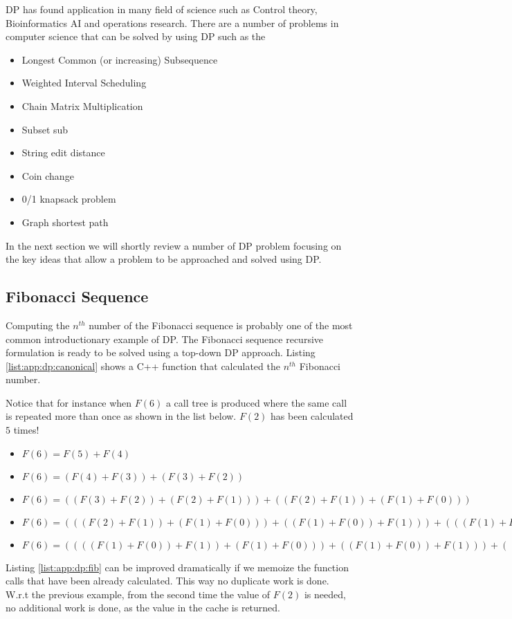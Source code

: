 DP has found application in many field of science such as Control theory,
Bioinformatics AI and operations research. There are a number of problems in
computer science that can be solved by using DP such as the 
\begin{itemize}
    \item Longest Common (or increasing) Subsequence
    \item Weighted Interval Scheduling
    \item Chain Matrix Multiplication
    \item Subset sub
    \item String edit distance
    \item Coin change
    \item 0/1 knapsack problem
    \item Graph shortest path
\end{itemize}

In the next section we will shortly review a number of DP problem focusing on
the key ideas that allow a problem to be approached and solved  using DP.

\subsection{Fibonacci Sequence}
Computing the $n^{th}$ number of the Fibonacci sequence is probably one of the
most common introductionary example of DP. The Fibonacci sequence recursive
formulation is ready to be solved using a top-down DP approach. Listing
\ref{list:app:dp:canonical} shows a C++ function that calculated the $n^{th}$ Fibonacci
number.

Notice that for instance when $F(6)$ a call tree is produced where the same call
is repeated more than once as shown in the list below. $F(2)$ has been
calculated $5$ times!
\begin{itemize}
    \item $F(6) = F(5)+F(4)$
    \item $F(6) = (F(4)+F(3)) + (F(3)+F(2))$
    \item $F(6) = ((F(3)+F(2))+(F(2)+F(1))) + ((F(2)+F(1))+(F(1)+F(0)))$
    \item $F(6) = (((F(2)+F(1))+(F(1)+F(0)))+((F(1)+F(0))+F(1))) + (((F(1)+F(0))+F(1))+(F(1)+F(0)))$
    \item $F(6) = ((((F(1)+F(0))+F(1))+(F(1)+F(0)))+((F(1)+F(0))+F(1))) + (((F(1)+F(0))+F(1))+(F(1)+F(0)))$
\end{itemize}

Listing \ref{list:app:dp:fib} can be improved dramatically if we memoize the function calls
that have been already calculated. This way no duplicate work is done. W.r.t the
previous example, from the second time the value of $F(2)$ is needed, no
additional work is done, as the value in the cache is returned.

